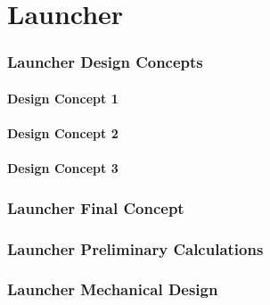 \part{Launcher}
\label{part:launcher}

\section{Launcher Design Concepts}
\label{sec:Launcher Design Concepts}
  \subsection{Design Concept 1}
  \label{sub:Design Concept 1}

  \subsection{Design Concept 2}
  \label{sub:Design Concept 2}

  \subsection{Design Concept 3}
  \label{sub:Design Concept 3}

\clearpage
\section{Launcher Final Concept}
\label{sec:Launcher Final Concept}

\clearpage
\section{Launcher Preliminary Calculations}
\label{sec:Launcher Preliminary Calculations}

\clearpage
\section{Launcher Mechanical Design}
\label{sec:Launcher Mechanical Design}

